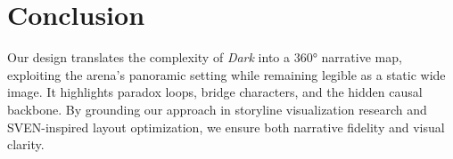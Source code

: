 \documentclass[a4paper,UKenglish]{lipics-v2021}
\begin{document}
\section*{Conclusion}
Our design translates the complexity of \emph{Dark} into a 360° narrative map, exploiting the arena’s panoramic setting while remaining legible as a static wide image. It highlights paradox loops, bridge characters, and the hidden causal backbone. By grounding our approach in storyline visualization research and SVEN-inspired layout optimization, we ensure both narrative fidelity and visual clarity.  


\end{document}
